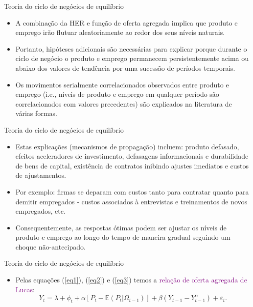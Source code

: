 \documentclass[10pt]{beamer}
\begin{document}
\begin{frame}{Teoria do ciclo de negócios de equilíbrio}
    \begin{itemize}
        \item A combinação da HER e função de oferta agregada implica que produto e emprego irão flutuar aleatoriamente ao redor dos seus níveis naturais.
        \bigskip
        \item Portanto, hipóteses adicionais são necessárias para explicar porque durante o ciclo de negócio o produto e emprego permanecem persistentemente acima ou abaixo dos valores de tendência por uma sucessão de períodos temporais.
        \bigskip
        \item Os movimentos serialmente correlacionados observados entre produto e emprego (i.e., níveis de produto e emprego em qualquer período são correlacionados com valores precedentes) são explicados na literatura de várias formas.
    \end{itemize}
\end{frame}

\begin{frame}{Teoria do ciclo de negócios de equilíbrio}
    \begin{itemize}
        \item Estas explicações (mecanismos de propagação) incluem: produto defasado, efeitos aceleradores de investimento, defasagens informacionais e durabilidade de bens de capital, existência de contratos inibindo ajustes imediatos e custos de ajustamentos.
        \bigskip
        \item Por exemplo: firmas se deparam com custos tanto para contratar quanto para demitir empregados - custos associados à entrevistas e treinamentos de novos empregados, etc.
        \bigskip
        \item Consequentemente, as respostas ótimas podem ser ajustar os níveis de produto e emprego ao longo do tempo de maneira gradual seguindo um choque não-antecipado.
    \end{itemize}
\end{frame}

\begin{frame}{Teoria do ciclo de negócios de equilíbrio}
    \begin{itemize}
        \item Pelas equações (\ref{eq1}), (\ref{eq2}) e (\ref{eq3}) temos a \textcolor{purple}{relação de oferta agregada de Lucas}:
        \begin{equation}
            Y_t = \lambda + \phi_t + \alpha[P_t - \mathbb{E}(P_t|\Omega_{t-1})] + \beta(Y_{t-1} - Y_{t-1}^n) + \varepsilon_t.
            \label{eq4}
        \end{equation}
    \end{itemize}
\end{frame}
\end{document}

